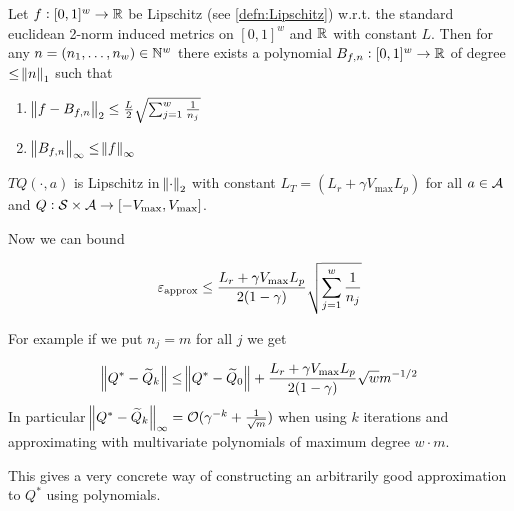 \begin{thm}
  Let $f : [0,1]^w \to \mathbb{R}$ be Lipschitz (see \cref{defn:Lipschitz})
  w.r.t. the standard euclidean 2-norm induced metrics on $[0,1]^w$ and $\mathbb{R}$
  with constant $L$. 
  Then for any $n = (n_1, \dots, n_w) \in \mathbb{N}^w$ there exists a polynomial
  $B_{f,n} : [0,1]^w \to \mathbb{R}$ of degree $\leq \norm{n}_1$ such that
  \begin{enumerate}
    \item $\norm{f - B_{f,n}}_2
      \leq \frac{L}{2} \sqrt{\sum_{j=1}^w \frac{1}{n_j}}$
    \item $\norm{B_{f,n}}_\infty \leq \norm{f}_\infty$
  \end{enumerate}
\end{thm}

\begin{lem}
  $TQ(\cdot, a)$ is Lipschitz in $\norm{\cdot}_2$ with constant
  $ L_T = (L_r + \gamma V_{\max} L_p) $
  for all $a \in \mathcal{A}$ and $Q : \mathcal{S} \times \mathcal{A} \to [-V_{\max},V_{\max}]$.
\end{lem}

Now we can bound

\begin{prop}
  \[ \varepsilon_{\mathrm{approx}} \leq \frac{L_r + \gamma V_{\max} L_p}{2(1-\gamma)}
  \sqrt{\sum_{j=1}^w \frac{1}{n_j}} \]
\end{prop}

For example if we put $n_j = m$ for all $j$ we get

\begin{prop}
  \[ \norm{Q^* - \widetilde{Q}_k} \leq \norm{Q^* - \widetilde{Q}_0}
    + \frac{L_r + \gamma V_{\max} L_p}{2(1-\gamma)} \sqrt{w}
  m^{-1/2} \]
  In particular $\norm{Q^* - \widetilde{Q}_k}_\infty
  = \mathcal{O}(\gamma^{-k} + \frac{1}{\sqrt{m}})$
  when using $k$ iterations and approximating
  with multivariate polynomials of maximum degree $w \cdot m$.
\end{prop}

This gives a very concrete way of constructing an arbitrarily good
approximation to $Q^*$ using polynomials.



